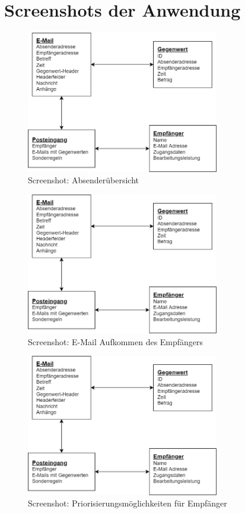 
\chapter{Screenshots der Anwendung}
\label{Screenshots_der_Anwendung}

\begin{figure}[!ht]
	\centering
		\includegraphics[width=0.75\textwidth]{Figures/Content Model.png}
	\caption{Screenshot: Absenderübersicht}
	\label{fig:screenshot_send/overview}
\end{figure}

\begin{figure}[!ht]
	\centering
		\includegraphics[width=0.75\textwidth]{Figures/Content Model.png}
	\caption{Screenshot: E-Mail Aufkommen des Empfängers}
	\label{fig:screenshot_send/capacity}
\end{figure}

\begin{figure}[!ht]
	\centering
		\includegraphics[width=0.75\textwidth]{Figures/Content Model.png}
	\caption{Screenshot: Priorisierungsmöglichkeiten für Empfänger}
	\label{fig:screenshot_send/priority}
\end{figure}